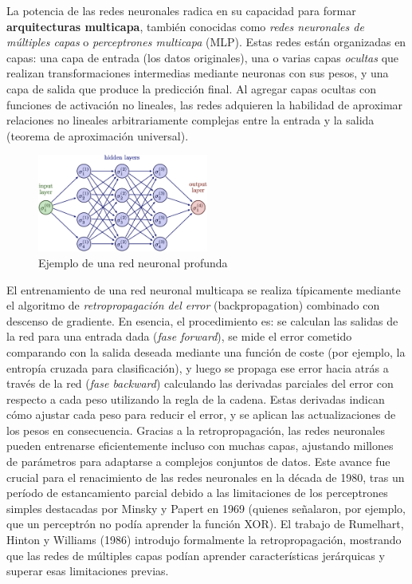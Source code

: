 \documentclass[11pt,spanish,listoffigures,listoftables]{tfgetsinf}
\begin{document}
La potencia de las redes neuronales radica en su capacidad para formar \textbf{arquitecturas multicapa}, también conocidas como \textit{redes neuronales de múltiples capas} 
o \textit{perceptrones multicapa} (MLP). Estas redes están organizadas en capas: una capa de entrada (los datos originales), una o varias capas \textit{ocultas} que 
realizan transformaciones intermedias mediante neuronas con sus pesos, y una capa de salida que produce la predicción final. Al agregar capas ocultas con funciones de 
activación no lineales, las redes adquieren la habilidad de aproximar relaciones no lineales arbitrariamente complejas entre la entrada y la salida (teorema de 
aproximación universal). 

\begin{figure}[htbp]
    \centering
    \includegraphics[width=0.5\textwidth]{neural_network.jpg}
    \caption{Ejemplo de una red neuronal profunda \cite{neural_network}}
    \label{fig:mi_imagen}
\end{figure}


El entrenamiento de una red neuronal multicapa se realiza típicamente mediante el algoritmo de \textit{retropropagación del error} (backpropagation) combinado con 
descenso de gradiente. En esencia, el procedimiento es: se calculan las salidas de la red para una entrada dada (\textit{fase forward}), se mide el error cometido 
comparando con la salida deseada mediante una función de coste (por ejemplo, la entropía cruzada para clasificación), y luego se propaga ese error hacia atrás a 
través de la red (\textit{fase backward}) calculando las derivadas parciales del error con respecto a cada peso utilizando la regla de la cadena. Estas derivadas 
indican cómo ajustar cada peso para reducir el error, y se aplican las actualizaciones de los pesos en consecuencia. Gracias a la retropropagación, las redes neuronales 
pueden entrenarse eficientemente incluso con muchas capas, ajustando millones de parámetros para adaptarse a complejos conjuntos de datos. Este avance fue crucial para 
el renacimiento de las redes neuronales en la década de 1980, tras un período de estancamiento parcial debido a las limitaciones de los perceptrones simples destacadas 
por Minsky y Papert en 1969 (quienes señalaron, por ejemplo, que un perceptrón no podía aprender la función XOR). El trabajo de Rumelhart, Hinton y Williams (1986) \cite{Rumelhart1986}
introdujo formalmente la retropropagación, mostrando que las redes de múltiples capas podían aprender características jerárquicas y superar esas limitaciones previas.
\end{document}
